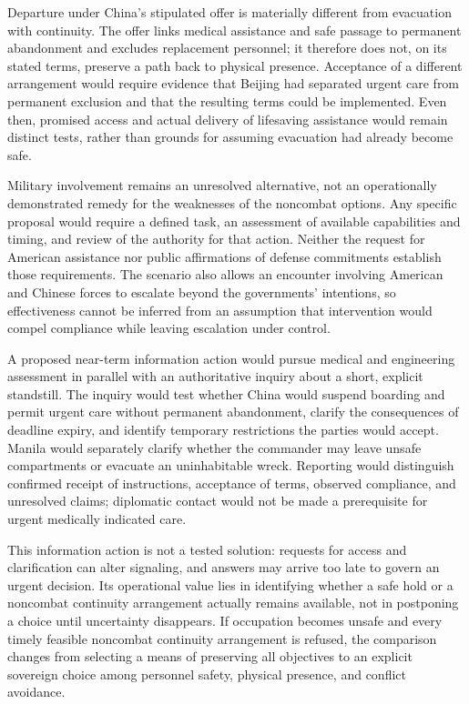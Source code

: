 \documentclass[11pt]{article}
\begin{document}
Departure under China's stipulated offer is materially different from evacuation with continuity. The offer links medical assistance and safe passage to permanent abandonment and excludes replacement personnel; it therefore does not, on its stated terms, preserve a path back to physical presence. Acceptance of a different arrangement would require evidence that Beijing had separated urgent care from permanent exclusion and that the resulting terms could be implemented. Even then, promised access and actual delivery of lifesaving assistance would remain distinct tests, rather than grounds for assuming evacuation had already become safe.

Military involvement remains an unresolved alternative, not an operationally demonstrated remedy for the weaknesses of the noncombat options. Any specific proposal would require a defined task, an assessment of available capabilities and timing, and review of the authority for that action. Neither the request for American assistance nor public affirmations of defense commitments establish those requirements. The scenario also allows an encounter involving American and Chinese forces to escalate beyond the governments' intentions, so effectiveness cannot be inferred from an assumption that intervention would compel compliance while leaving escalation under control.

A proposed near-term information action would pursue medical and engineering assessment in parallel with an authoritative inquiry about a short, explicit standstill. The inquiry would test whether China would suspend boarding and permit urgent care without permanent abandonment, clarify the consequences of deadline expiry, and identify temporary restrictions the parties would accept. Manila would separately clarify whether the commander may leave unsafe compartments or evacuate an uninhabitable wreck. Reporting would distinguish confirmed receipt of instructions, acceptance of terms, observed compliance, and unresolved claims; diplomatic contact would not be made a prerequisite for urgent medically indicated care.

This information action is not a tested solution: requests for access and clarification can alter signaling, and answers may arrive too late to govern an urgent decision. Its operational value lies in identifying whether a safe hold or a noncombat continuity arrangement actually remains available, not in postponing a choice until uncertainty disappears. If occupation becomes unsafe and every timely feasible noncombat continuity arrangement is refused, the comparison changes from selecting a means of preserving all objectives to an explicit sovereign choice among personnel safety, physical presence, and conflict avoidance.
\end{document}
